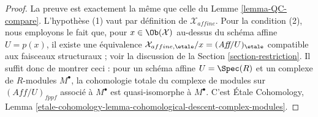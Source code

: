 \begin{proof}
La preuve est exactement la même que celle du Lemme \ref{lemma-QC-compare}.
L'hypothèse (1) vaut par définition de $\mathcal{X}_{affine}$.
Pour la condition (2), nous employons le fait que, pour $x \in \Ob(\mathcal{X})$
au-dessus du schéma affine $U = p(x)$, il existe une équivalence
$\mathcal{X}_{affine, \etale}/x = (\textit{Aff}/U)_\etale$ compatible
aux faisceaux structuraux ; voir la
discussion de la Section \ref{section-restriction}.
Il suffit donc de montrer ceci : pour un schéma affine $U = \Spec(R)$
et un complexe de $R$-modules $M^\bullet$, la cohomologie totale
du complexe de modules sur $(\textit{Aff}/U)_{fppf}$
associé à $M^\bullet$ est quasi-isomorphe à $M^\bullet$.
C'est Étale Cohomology, Lemma
\ref{etale-cohomology-lemma-cohomological-descent-complex-modules}.
\end{proof}
















